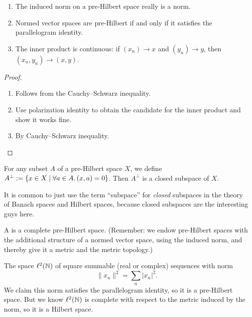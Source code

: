 \begin{theorem}
\begin{enumerate}
\item The induced norm on a pre-Hilbert space really is a norm.
\item Normed vector spaces are pre-Hilbert if and only if it satisfies
  the parallelogram identity.
\item The inner product is continuous: if $(x_{n})\to x$ and
  $(y_{n})\to y$, then $(x_{n},y_{n})\to (x,y)$.
\end{enumerate}
\end{theorem}

\begin{proof}
\begin{enumerate}
\item Follows from the Cauchy--Schwarz inequality.
\item Use polarization identity to obtain the candidate for the inner
  product and show it works fine.
\item By Cauchy--Schwarz inequality.\qedhere
\end{enumerate}
\end{proof}

\begin{corollary}
For any subset $A$ of a pre-Hilbert space $X$, we define
$A^{\perp}:=\{x\in X\mid\forall a\in A\ldotp (x,a)=0\}$.
Then $A^{\perp}$ is a closed subspace of $X$.
\end{corollary}

\begin{remark}
It is common to just use the term ``subspace'' for \emph{closed}
subspaces in the theory of Banach spaces and Hilbert spaces, because
closed subspaces are the interesting guys here.
\end{remark}

\begin{definition}
A  is a complete pre-Hilbert space. (Remember:
we endow pre-Hilbert spaces with the additional structure of a normed
vector space, using the induced norm, and thereby give it a metric and
the metric topology.)
\end{definition}

\begin{example}
The space $\ell^{2}(\mathbb{N})$ of square summable (real or complex)
sequences with norm
\begin{equation}
\|x_{n}\|^{2}=\sum_{n}|x_{n}|^{2}.
\end{equation}
We claim this norm satisfies the parallelogram identity, so it is a
pre-Hilbert space. But we know $\ell^{2}(\mathbb{N})$ is complete with
respect to the metric induced by the norm, so it is a Hilbert space.
\end{example}

